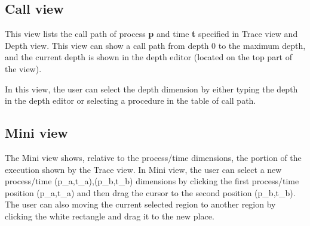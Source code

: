 \documentclass[english]{article}
\begin{document}
\subsection{Call view}

This view lists the call path of process \textbf{p} and time \textbf{t} specified in Trace view and Depth view.
This view can show a call path from depth $0$ to the maximum depth, and the current depth is shown in the depth editor (located on the top part of the view).

In this view, the user can select the depth dimension by either typing the depth in the depth editor or selecting a procedure in the table of call path.

\subsection{Mini view}

The Mini view shows, relative to the process/time dimensions, the portion of the execution shown by the Trace view.
In Mini view, the user can select a new process/time (p_a,t_a),(p_b,t_b) dimensions by clicking the first process/time position (p_a,t_a) and then drag the cursor to the second position (p_b,t_b).
The user can also moving the current selected region to another region by clicking the white rectangle and drag it to the new place.



\end{document}
